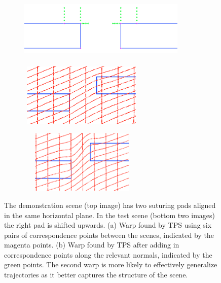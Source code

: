 
\begin{figure}[h!]
\centering
\begin{subfigure}[b]{0.9\textwidth}
\centering
\hspace{-0.7cm}
\includegraphics[width=8cm, height=3cm]{normals_points}
\end{subfigure}
\begin{subfigure}[b]{0.4\textwidth}
\includegraphics[width=6cm, height=3cm]{TPS_withoutnormals}
\caption{}
\end{subfigure}
\hspace{0.02\textwidth}
\begin{subfigure}[b]{0.4\textwidth}
\includegraphics[width=6cm, height=3cm]{TPS_withnormals}
\caption{}
\end{subfigure}
\caption{The demonstration scene (top image) has two suturing pads aligned in the same horizontal plane. In the test scene (bottom two images) the right pad is shifted upwards. (a) Warp found by TPS using six pairs of correspondence points between the scenes, indicated by the magenta points. (b) Warp found by TPS after adding in correspondence points along the relevant normals, indicated by the green points. The second warp is more likely to effectively generalize trajectories as it better captures the structure of the scene.}
\label{fig:normals}
\end{figure}
